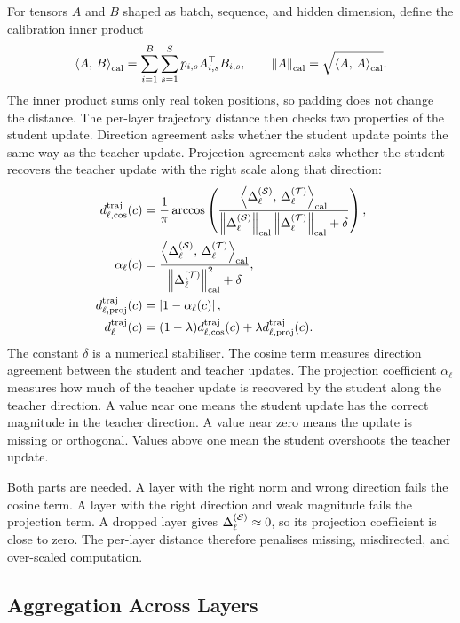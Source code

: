 For tensors $A$ and $B$ shaped as batch, sequence, and hidden dimension, define the calibration inner product
\begin{equation}
\left\langle A,\,B\right\rangle_{\mathrm{cal}}
=
\sum_{i=1}^{B}
\sum_{s=1}^{S}
p_{i,s}
A_{i,s}^{\top}B_{i,s},
\qquad
\left\lVert A\right\rVert_{\mathrm{cal}}
=
\sqrt{\left\langle A,\,A\right\rangle_{\mathrm{cal}}}.
\label{eq:cal_inner}
\end{equation}
The inner product sums only real token positions, so padding does not change the distance. The per-layer trajectory distance then checks two properties of the student update. Direction agreement asks whether the student update points the same way as the teacher update. Projection agreement asks whether the student recovers the teacher update with the right scale along that direction:
\begin{align}
d^{\mathrm{traj}}_{\ell,\cos}(c)
&=
\frac{1}{\pi}
\arccos
\left(
\frac{
\left\langle\Delta^{(\mathcal{S})}_{\ell},\,\Delta^{(\mathcal{T})}_{\ell}\right\rangle_{\mathrm{cal}}
}{
\left\lVert\Delta^{(\mathcal{S})}_{\ell}\right\rVert_{\mathrm{cal}}
\left\lVert\Delta^{(\mathcal{T})}_{\ell}\right\rVert_{\mathrm{cal}}
+\delta
}
\right),
\label{eq:metric_cos}\\
\alpha_\ell(c)
&=
\frac{
\left\langle\Delta^{(\mathcal{S})}_{\ell},\,\Delta^{(\mathcal{T})}_{\ell}\right\rangle_{\mathrm{cal}}
}{
\left\lVert\Delta^{(\mathcal{T})}_{\ell}\right\rVert_{\mathrm{cal}}^2+\delta
},
\label{eq:metric_projection_coeff}\\
d^{\mathrm{traj}}_{\ell,\mathrm{proj}}(c)
&=
\left\lvert1-\alpha_\ell(c)\right\rvert,\\
d^{\mathrm{traj}}_\ell(c)
&=
(1-\lambda)d^{\mathrm{traj}}_{\ell,\cos}(c)
+
\lambda d^{\mathrm{traj}}_{\ell,\mathrm{proj}}(c).
\label{eq:layer_distance}
\end{align}
The constant $\delta$ is a numerical stabiliser. The cosine term measures direction agreement between the student and teacher updates. The projection coefficient $\alpha_\ell$ measures how much of the teacher update is recovered by the student along the teacher direction. A value near one means the student update has the correct magnitude in the teacher direction. A value near zero means the update is missing or orthogonal. Values above one mean the student overshoots the teacher update.

Both parts are needed. A layer with the right norm and wrong direction fails the cosine term. A layer with the right direction and weak magnitude fails the projection term. A dropped layer gives $\Delta^{(\mathcal{S})}_{\ell}\approx 0$, so its projection coefficient is close to zero. The per-layer distance therefore penalises missing, misdirected, and over-scaled computation.

\subsection{Aggregation Across Layers}

